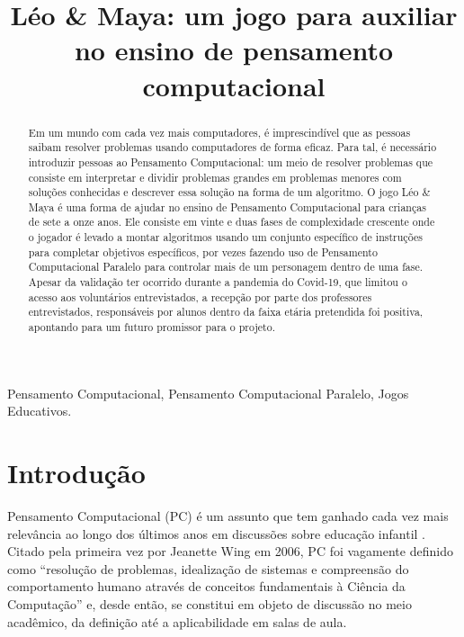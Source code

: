\documentclass[conference]{IEEEtran}
\begin{document}
\title{Léo \& Maya: um jogo para auxiliar no ensino de pensamento computacional
}

%


\maketitle


\begin{abstract}
Em um mundo com cada vez mais computadores, é imprescindível que as pessoas saibam resolver problemas usando computadores de forma eficaz. Para tal, é necessário introduzir pessoas ao Pensamento Computacional: um meio de resolver problemas que consiste em interpretar e dividir problemas grandes em problemas menores com soluções conhecidas e descrever essa solução na forma de um algoritmo. O jogo Léo \& Maya é uma forma de ajudar no ensino de Pensamento Computacional para crianças de sete a onze anos. Ele consiste em vinte e duas fases de complexidade crescente onde o jogador é levado a montar algoritmos usando um conjunto específico de instruções para completar objetivos específicos, por vezes fazendo uso de Pensamento Computacional Paralelo para controlar mais de um personagem dentro de uma fase. Apesar da validação ter ocorrido durante a pandemia do Covid-19, que limitou o acesso aos voluntários entrevistados, a recepção por parte dos professores entrevistados, responsáveis por alunos dentro da faixa etária pretendida foi positiva, apontando para um futuro promissor para o projeto.
\end{abstract}

\renewcommand{\IEEEkeywordsname}{Palavras-Chave}
\begin{IEEEkeywords}
Pensamento Computacional, Pensamento Computacional Paralelo, Jogos Educativos.
\end{IEEEkeywords}

\section{Introdução}

Pensamento Computacional (PC) é um assunto que tem ganhado cada vez mais relevância ao longo dos últimos anos em discussões sobre educação infantil \cite{barr_bringing_2011}. Citado pela primeira vez por Jeanette Wing em 2006, PC foi vagamente definido como ``resolução de problemas, idealização de sistemas e compreensão do comportamento humano através de conceitos fundamentais à Ciência da Computação''\cite{wing_computational_2006} e, desde então, se constitui em objeto de discussão no meio acadêmico, da definição até a aplicabilidade em salas de aula.
\end{document}
